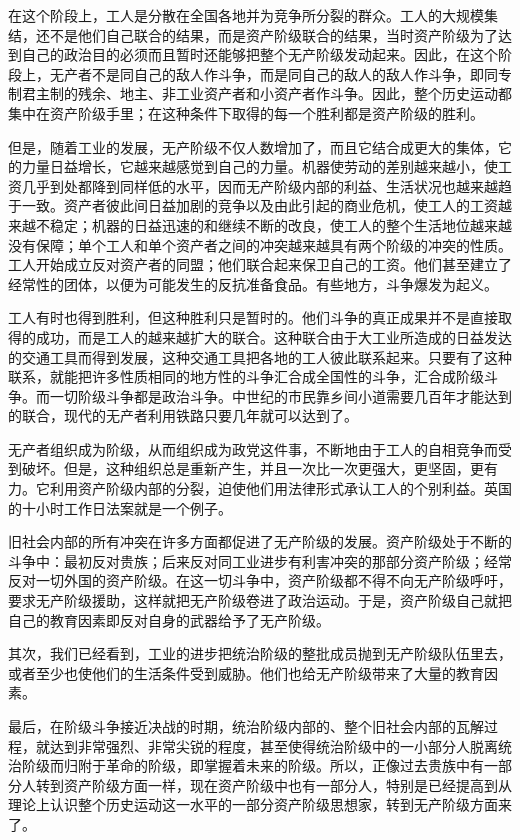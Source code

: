 \documentclass[10pt, UTF8]{book} %
\begin{document}
在这个阶段上，工人是分散在全国各地并为竞争所分裂的群众。工人的大规模集结，还不是他们自己联合的结果，而是资产阶级联合的结果，当时资产阶级为了达到自己的政治目的必须而且暂时还能够把整个无产阶级发动起来。因此，在这个阶段上，无产者不是同自己的敌人作斗争，而是同自己的敌人的敌人作斗争，即同专制君主制的残余、地主、非工业资产者和小资产者作斗争。因此，整个历史运动都集中在资产阶级手里；在这种条件下取得的每一个胜利都是资产阶级的胜利。

但是，随着工业的发展，无产阶级不仅人数增加了，而且它结合成更大的集体，它的力量日益增长，它越来越感觉到自己的力量。机器使劳动的差别越来越小，使工资几乎到处都降到同样低的水平，因而无产阶级内部的利益、生活状况也越来越趋于一致。资产者彼此间日益加剧的竞争以及由此引起的商业危机，使工人的工资越来越不稳定；机器的日益迅速的和继续不断的改良，使工人的整个生活地位越来越没有保障；单个工人和单个资产者之间的冲突越来越具有两个阶级的冲突的性质。工人开始成立反对资产者的同盟；他们联合起来保卫自己的工资。他们甚至建立了经常性的团体，以便为可能发生的反抗准备食品。有些地方，斗争爆发为起义。

工人有时也得到胜利，但这种胜利只是暂时的。他们斗争的真正成果并不是直接取得的成功，而是工人的越来越扩大的联合。这种联合由于大工业所造成的日益发达的交通工具而得到发展，这种交通工具把各地的工人彼此联系起来。只要有了这种联系，就能把许多性质相同的地方性的斗争汇合成全国性的斗争，汇合成阶级斗争。而一切阶级斗争都是政治斗争。中世纪的市民靠乡间小道需要几百年才能达到的联合，现代的无产者利用铁路只要几年就可以达到了。

无产者组织成为阶级，从而组织成为政党这件事，不断地由于工人的自相竞争而受到破坏。但是，这种组织总是重新产生，并且一次比一次更强大，更坚固，更有力。它利用资产阶级内部的分裂，迫使他们用法律形式承认工人的个别利益。英国的十小时工作日法案就是一个例子。

旧社会内部的所有冲突在许多方面都促进了无产阶级的发展。资产阶级处于不断的斗争中：最初反对贵族；后来反对同工业进步有利害冲突的那部分资产阶级；经常反对一切外国的资产阶级。在这一切斗争中，资产阶级都不得不向无产阶级呼吁，要求无产阶级援助，这样就把无产阶级卷进了政治运动。于是，资产阶级自己就把自己的教育因素即反对自身的武器给予了无产阶级。

其次，我们已经看到，工业的进步把统治阶级的整批成员抛到无产阶级队伍里去，或者至少也使他们的生活条件受到威胁。他们也给无产阶级带来了大量的教育因素。

最后，在阶级斗争接近决战的时期，统治阶级内部的、整个旧社会内部的瓦解过程，就达到非常强烈、非常尖锐的程度，甚至使得统治阶级中的一小部分人脱离统治阶级而归附于革命的阶级，即掌握着未来的阶级。所以，正像过去贵族中有一部分人转到资产阶级方面一样，现在资产阶级中也有一部分人，特别是已经提高到从理论上认识整个历史运动这一水平的一部分资产阶级思想家，转到无产阶级方面来了。
\end{document}
